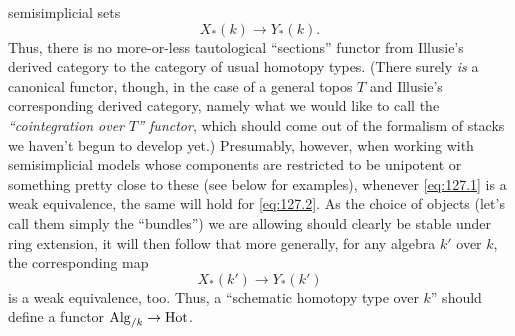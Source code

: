 semisimplicial sets
\begin{equation}
  \label{eq:127.2}
  X_*(k) \to Y_*(k).\tag{2}
\end{equation}
Thus, there is no more-or-less tautological ``sections'' functor from
Illusie's derived category to the category \Hot{} of usual homotopy
types. (There surely \emph{is} a canonical functor, though, in the
case of a general topos $T$ and Illusie's corresponding derived
category, namely what we would like to call the \emph{``cointegration
  over $T$'' functor}, which should come out of the formalism of
stacks we haven't begun to develop yet.)\enspace
Presumably, however, when working with semisimplicial models whose
components are restricted to be unipotent or something pretty close to
these (see below for examples), whenever \eqref{eq:127.1} is a weak
equivalence, the same will hold for \eqref{eq:127.2}. As the choice of
objects (let's call them simply the ``bundles'') we are allowing
should clearly be stable under ring extension, it will then follow
that more generally, for any algebra $k'$ over $k$, the corresponding
map
\begin{equation}
  \label{eq:127.2prime}
  X_*(k')\to Y_*(k')\tag{2'}
\end{equation}
is a weak equivalence, too. Thus, a ``schematic homotopy
type over $k$'' should define a functor $\operatorname{Alg}_{/k} \to \operatorname{Hot}$.


